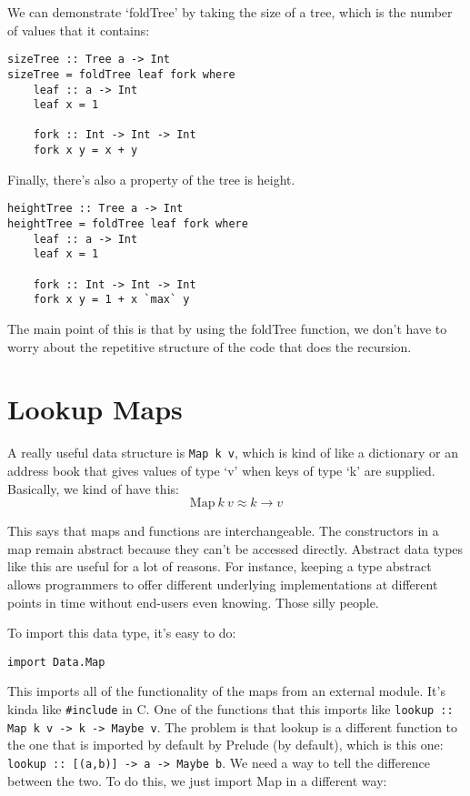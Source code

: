 \documentclass[11pt,a4paper,titlepage,dvipsnames,cmyk]{scrartcl}
\begin{document}
We can demonstrate `foldTree' by taking the size of a tree, which is the
number of values that it contains:

\begin{lstlisting}[style=B]
sizeTree :: Tree a -> Int
sizeTree = foldTree leaf fork where
    leaf :: a -> Int
    leaf x = 1

    fork :: Int -> Int -> Int
    fork x y = x + y
\end{lstlisting}

Finally, there's also a property of the tree is height.
\begin{lstlisting}[style=B]
heightTree :: Tree a -> Int
heightTree = foldTree leaf fork where
    leaf :: a -> Int
    leaf x = 1

    fork :: Int -> Int -> Int
    fork x y = 1 + x `max` y
\end{lstlisting}

The main point of this is that by using the foldTree function, we don't
have to worry about the repetitive structure of the code that does the
recursion.

\section{Lookup Maps}%
\label{sec:maps}
A really useful data structure is \lstinline|Map k v|, which is kind of
like a dictionary or an address book that gives values of type `v' when
keys of type `k' are supplied. Basically, we kind of have this:
\begin{equation*}
    \text{Map} \ k \ v \approx k \rightarrow v
\end{equation*}

This says that maps and functions are interchangeable. The constructors in
a map remain abstract because they can't be accessed directly. Abstract
data types like this are useful for a lot of reasons. For instance,
keeping a type abstract allows programmers to offer different underlying
implementations at different points in time without end-users even
knowing. Those silly people.

To import this data type, it's easy to do:
\begin{lstlisting}[style=B]
import Data.Map
\end{lstlisting}

This imports all of the functionality of the maps from an external module.
It's kinda like \lstinline|#include| in C. One of the functions that this
imports like \lstinline|lookup :: Map k v -> k -> Maybe v|. The problem is
that lookup is a different function to the one that is imported by default
by Prelude (by default), which is this one:
\lstinline|lookup :: [(a,b)] -> a -> Maybe b|. We need a way to tell the
difference between the two. To do this, we just import Map in a different
way:
\end{document}
